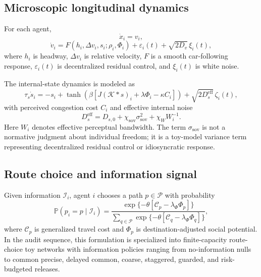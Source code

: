 \documentclass[11pt]{article}
\begin{document}
\subsection{Microscopic longitudinal dynamics}
For each agent,
\begin{equation}
\dot{x}_i=v_i,
\end{equation}
\begin{equation}
\dot{v}_i=F(h_i,\Delta v_i,s_i;\rho_i,\Phi_i)+\varepsilon_i(t)+\sqrt{2D_v}\,\xi_i(t),
\end{equation}
where $h_i$ is headway, $\Delta v_i$ is relative velocity, $F$ is a smooth car-following response, $\varepsilon_i(t)$ is decentralized residual control, and $\xi_i(t)$ is white noise.

The internal-state dynamics is modeled as
\begin{equation}
\tau_s\dot{s}_i=-s_i+\tanh\!\left(\beta[J(\mathcal K*s)_i+\lambda\Phi_i-\kappa C_i]\right)+\sqrt{2D_s^{\mathrm{eff}}}\,\zeta_i(t),
\end{equation}
with perceived congestion cost $C_i$ and effective internal noise
\begin{equation}
D_s^{\mathrm{eff}}=D_{s,0}+\chi_{\mathrm{sov}}\sigma_{\mathrm{sov}}^2+\chi_W W_i^{-1}.
\end{equation}
Here $W_i$ denotes effective perceptual bandwidth. The term $\sigma_{\mathrm{sov}}$ is not a normative judgment about individual freedom; it is a toy-model variance term representing decentralized residual control or idiosyncratic response.

\subsection{Route choice and information signal}
Given information $\mathcal I_i$, agent $i$ chooses a path $p\in\mathcal P$ with probability
\begin{equation}
\mathbb P(p_i=p\mid \mathcal I_i)=\frac{\exp\{-\theta[\mathcal C_p-\lambda_\Phi\Phi_p]\}}{\sum_{q\in\mathcal P}\exp\{-\theta[\mathcal C_q-\lambda_\Phi\Phi_q]\}},
\end{equation}
where $\mathcal C_p$ is generalized travel cost and $\Phi_p$ is destination-adjusted social potential. In the audit sequence, this formulation is specialized into finite-capacity route-choice toy networks with information policies ranging from no-information nulls to common precise, delayed common, coarse, staggered, guarded, and risk-budgeted releases.
\end{document}
